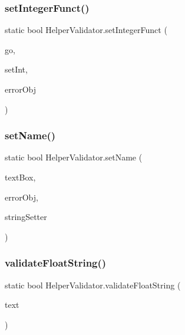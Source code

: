\subsubsection{\texorpdfstring{set\+Integer\+Funct()}{setIntegerFunct()}}
{\footnotesize\ttfamily static bool Helper\+Validator.\+set\+Integer\+Funct (\begin{DoxyParamCaption}\item[{Game\+Object}]{go,  }\item[{\mbox{\hyperlink{_helper_validator_8cs_a39d82d930145ffb7e5326699e0ef7f27}{Int\+Funct}}}]{set\+Int,  }\item[{Game\+Object}]{error\+Obj }\end{DoxyParamCaption})\hspace{0.3cm}{\ttfamily [static]}}

\mbox{\label{class_helper_validator_ac0d529df7419bf6aec6754c43565d4cc}} 
\subsubsection{\texorpdfstring{set\+Name()}{setName()}}
{\footnotesize\ttfamily static bool Helper\+Validator.\+set\+Name (\begin{DoxyParamCaption}\item[{Game\+Object}]{text\+Box,  }\item[{Game\+Object}]{error\+Obj,  }\item[{\mbox{\hyperlink{_helper_validator_8cs_a960dfdb4c2811fe6c539a15632075939}{String\+Funct}}}]{string\+Setter }\end{DoxyParamCaption})\hspace{0.3cm}{\ttfamily [static]}}

\mbox{\label{class_helper_validator_a655881eabb458927f86ff12201f68ba1}} 
\subsubsection{\texorpdfstring{validate\+Float\+String()}{validateFloatString()}}
{\footnotesize\ttfamily static bool Helper\+Validator.\+validate\+Float\+String (\begin{DoxyParamCaption}\item[{string}]{text }\end{DoxyParamCaption})\hspace{0.3cm}{\ttfamily [static]}}

